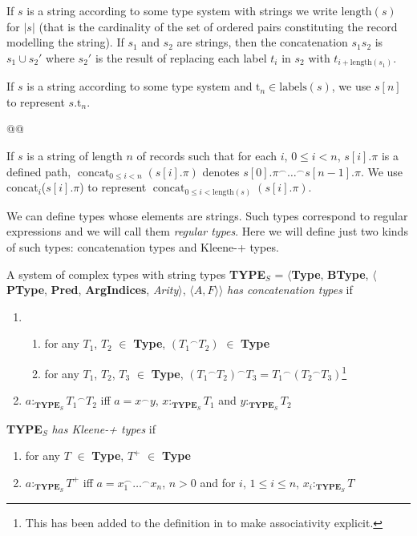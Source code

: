 If $s$ is a string according to some type system with strings we write
$\mathrm{length}(s)$ for $|s|$ (that is the cardinality of the set of
ordered pairs constituting the record modelling the string).  If $s_1$
and $s_2$ are
strings, then the concatenation $s_1s_2$ is $s_1\cup s_2'$ where $s_2'$
is the result of replacing each label $t_i$ in $s_2$ with $t_{i+\mathrm{length}(s_1)}$.

If $s$ is a string according to some type system and $\text{t}_n\in\mathrm{labels}(s)$, we use $s[n]$ to
represent $s.\text{t}_n$.

@@

If $s$ is a string of length $n$ of records such that for each $i$,
$0\leq i<n$, $s[i].\pi$ is a defined path, 
$\displaystyle\mathop{\mathrm{concat}}_{0\leq i<n}(s[i].\pi)$ denotes
$s[0].\pi^{\frown}\ldots^{\frown}s[n-1].\pi$.  We use
concat$_i$($s[i].\pi$) to represent $\displaystyle\mathop{\mathrm{concat}}_{0\leq i<\mathrm{length}(s)}(s[i].\pi)$. 
  
 
We can define types whose elements are strings.  Such types correspond
to regular expressions and we will call them \textit{regular types}.
Here we will define just two kinds of such types:  concatenation types
and Kleene-+ types.

A system of complex types with string types \textbf{TYPE}$_S$ = $\langle${\bf Type}, {\bf BType},
$\langle$\textbf{PType}, {\bf Pred}, \textbf{ArgIndices}, {\it
  Arity\/}$\rangle$, $\langle A,F\rangle$$\rangle$ \textit{has
  concatenation types} if 
\begin{enumerate} 
 
\item 
\begin{enumerate}
\item for any $T_1$, $T_2$ $\in$ {\bf Type},  $({T_1}^\frown\!T_2)$
  $\in$ {\bf Type}

\item for any $T_1$, $T_2$, $T_3$ $\in$ \textbf{Type},
  $({T_1}^{\frown}T_2)^{\frown}T_3 =
  {T_1}^{\frown}({T_2}^{\frown}T_3)$\footnote{This has been added to
    the definition in \cite{Cooper2012} to make associativity explicit.}
\end{enumerate}
 
\item $a :_{\mathbf{TYPE}_S} {T_1}^\frown\!T_2$ iff $a=x^\frown\!y$, $x:_{\mathbf{TYPE}_S}T_1$ and $y:_{\mathbf{TYPE}_S}T_2$ 
 
\end{enumerate} 
\textbf{TYPE}$_S$ \textit{has Kleene-+ types} if
\begin{enumerate} 
 
\item 
for any $T$ $\in$ {\bf Type},  $T^+$ $\in$ {\bf Type} 
 
\item $a:_{\mathbf{TYPE}_S}T^+$ iff $a=x_1^\frown\!\ldots^\frown\!x_n$, $n>0$ and for $i$, $1\leq
i\leq n$, $x_i:_{\mathbf{TYPE}_S}T$ 
 
\end{enumerate} 

